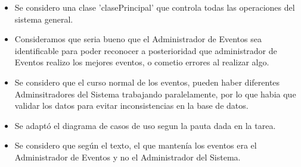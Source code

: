 \begin{itemize}
	\item Se considero una clase 'clasePrincipal' que controla todas las operaciones del sistema general.
	\item Consideramos que seria bueno que el Administrador de Eventos sea identificable para poder reconocer a posterioridad que administrador de Eventos realizo los mejores eventos, o cometio errores al realizar algo.
	\item Se considero que el curso normal de los eventos, pueden haber diferentes Adminsitradores del Sistema trabajando paralelamente, por lo que habia que validar los datos para evitar inconsistencias en la base de datos.
	\item Se adapt\'o el diagrama de casos de uso segun la pauta dada en la tarea.
	\item Se considero que seg\'un el texto, el que manten\'ia los eventos era el Administrador de Eventos y no el Administrador del Sistema.
\end{itemize}
